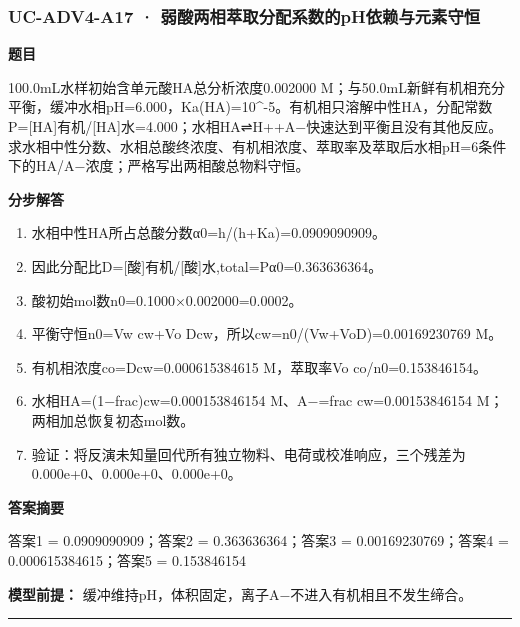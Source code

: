 \documentclass[UTF8,11pt,a4paper]{ctexart}
\begin{document}
\subsubsection*{UC-ADV4-A17 · 弱酸两相萃取分配系数的pH依赖与元素守恒}
\noindent\textbf{题目}\par
100.0mL水样初始含单元酸HA总分析浓度0.002000 M；与50.0mL新鲜有机相充分平衡，缓冲水相pH=6.000，Ka(HA)=10\textasciicircum{}-5。有机相只溶解中性HA，分配常数P=[HA]有机/[HA]水=4.000；水相HA⇌H++A−快速达到平衡且没有其他反应。求水相中性分数、水相总酸终浓度、有机相浓度、萃取率及萃取后水相pH=6条件下的HA/A−浓度；严格写出两相酸总物料守恒。\par
\medskip\noindent\textbf{分步解答}
\begin{enumerate}
\item 水相中性HA所占总酸分数α0=h/(h+Ka)=0.0909090909。
\item 因此分配比D=[酸]有机/[酸]水,total=Pα0=0.363636364。
\item 酸初始mol数n0=0.1000×0.002000=0.0002。
\item 平衡守恒n0=Vw cw+Vo Dcw，所以cw=n0/(Vw+VoD)=0.00169230769 M。
\item 有机相浓度co=Dcw=0.000615384615 M，萃取率Vo co/n0=0.153846154。
\item 水相HA=(1−frac)cw=0.000153846154 M、A−=frac cw=0.00153846154 M；两相加总恢复初态mol数。
\item 验证：将反演未知量回代所有独立物料、电荷或校准响应，三个残差为0.000e+0、0.000e+0、0.000e+0。
\end{enumerate}
\noindent\textbf{答案摘要}\par
答案1 = 0.0909090909；答案2 = 0.363636364；答案3 = 0.00169230769；答案4 = 0.000615384615；答案5 = 0.153846154\par
\noindent\textbf{模型前提：}
缓冲维持pH，体积固定，离子A−不进入有机相且不发生缔合。\par
\medskip\hrule\medskip
{}
\end{document}
